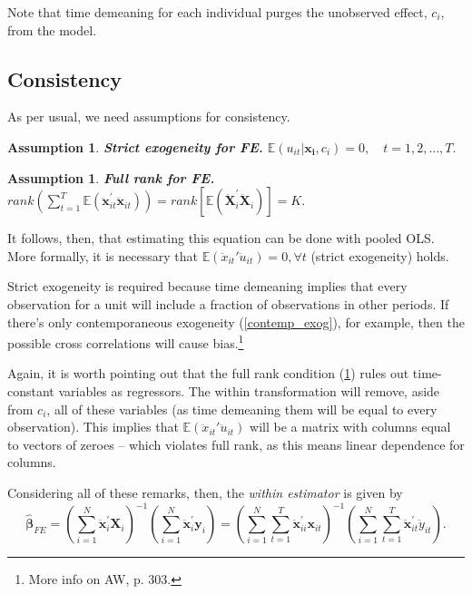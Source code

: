 \documentclass[11pt, a4paper]{report}
\theoremstyle{plain}
\newtheorem{assump}[thm]{Assumption}
\theoremstyle{plain}
\theoremstyle{remark}
\begin{document}
Note that time demeaning for each individual purges the unobserved effect, $c_i$, from the model. 

\subsection{Consistency}

As per usual, we need assumptions for consistency.

\begin{assump}
    \textbf{Strict exogeneity for FE.} $\mathbb{E}(u_{it} | \mathbf{x_i},c_i) = 0, \quad t = 1,2,...,T.$ \label{strict_exog_fe}
\end{assump}

\begin{assump}
    \textbf{Full rank for FE.} $rank\left(\sum_{t=1}^{T} \mathbb{E}\left(\ddot{\mathbf{x}}_{i t}^{\prime} \ddot{\mathbf{x}}_{i t}\right)\right)=rank\left[\mathbb{E}\left(\ddot{\mathbf{X}}_{i}^{\prime} \ddot{\mathbf{X}}_{i}\right)\right]=K.$ \label{full_rank_fe}
\end{assump}


It follows, then, that estimating this equation can be done with pooled OLS. More formally, it is necessary that $\mathbb{E}(\ddot{x}_{it}'\ddot{u}_{it}) = 0, \forall t$ (strict exogeneity) holds. 

Strict exogeneity is required because time demeaning implies that every observation for a unit will include a fraction of observations in other periods. If there's only contemporaneous exogeneity (\ref{contemp_exog}), for example, then the possible cross correlations will cause bias.\footnote{More info on AW, p. 303.}

Again, it is worth pointing out that the full rank condition (\ref{full_rank_fe}) rules out time-constant variables as regressors. The within transformation will remove, aside from $c_i$, all of these variables (as time demeaning them will be equal to every observation). This implies that $\mathbb{E}(\ddot{x}_{it}'\ddot{u}_{it})$ will be a matrix with columns equal to vectors of zeroes -- which violates full rank, as this means linear dependence for columns. 

Considering all of these remarks, then, the \textit{within estimator} is given by
\begin{equation}
    \hat{\boldsymbol{\beta}}_{F E}=\left(\sum_{i=1}^{N} \ddot{\mathbf{x}}_{i}^{\prime} \mathbf{X}_{i}\right)^{-1}\left(\sum_{i=1}^{N} \ddot{\mathbf{x}}_{i}^{\prime} \mathbf{y}_{i}\right)=\left(\sum_{i=1}^{N} \sum_{t=1}^{T} \ddot{\mathbf{x}}_{i i}^{\prime} \mathbf{x}_{i t}\right)^{-1}\left(\sum_{i=1}^{N} \sum_{t=1}^{T} \ddot{\mathbf{x}}_{i t}^{\prime} \ddot{y}_{i t}\right). \label{fe_estimator}
\end{equation}
\end{document}
